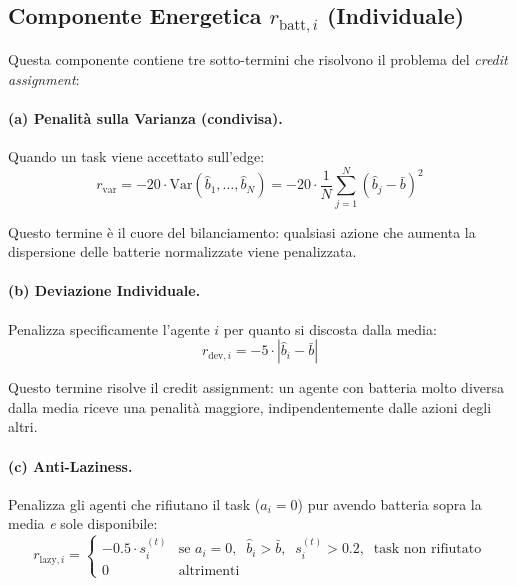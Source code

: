 \documentclass[11pt,a4paper]{article}
\begin{document}
\subsection{Componente Energetica $r_{\text{batt},i}$ (Individuale)}

Questa componente contiene tre sotto-termini che risolvono il problema del \emph{credit assignment}:

\paragraph{(a) Penalit\`a sulla Varianza (condivisa).} Quando un task viene accettato sull'edge:
\begin{equation}
r_{\text{var}} = -20 \cdot \text{Var}\!\left(\hat{b}_1, \ldots, \hat{b}_N\right) = -20 \cdot \frac{1}{N}\sum_{j=1}^{N}\left(\hat{b}_j - \bar{b}\right)^2
\end{equation}

Questo termine \`e il cuore del bilanciamento: qualsiasi azione che aumenta la dispersione delle batterie normalizzate viene penalizzata.

\paragraph{(b) Deviazione Individuale.} Penalizza specificamente l'agente $i$ per quanto si discosta dalla media:
\begin{equation}
r_{\text{dev},i} = -5 \cdot \left|\hat{b}_i - \bar{b}\right|
\end{equation}

Questo termine risolve il credit assignment: un agente con batteria molto diversa dalla media riceve una penalità maggiore, indipendentemente dalle azioni degli altri.

\paragraph{(c) Anti-Laziness.} Penalizza gli agenti che rifiutano il task ($a_i = 0$) pur avendo batteria sopra la media \emph{e} sole disponibile:
\begin{equation}
r_{\text{lazy},i} =
\begin{cases}
-0.5 \cdot s_i^{(t)} & \text{se } a_i = 0,\;\; \hat{b}_i > \bar{b},\;\; s_i^{(t)} > 0.2,\;\; \text{task non rifiutato} \\
0 & \text{altrimenti}
\end{cases}
\end{equation}
\end{document}
